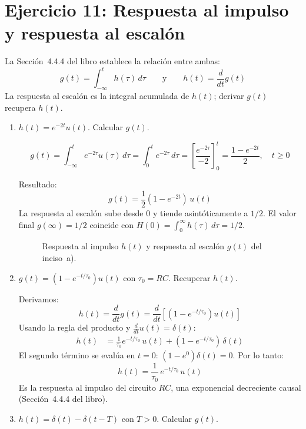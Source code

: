 \documentclass[10pt,a4paper]{article}
\begin{document}
	\section*{Ejercicio 11: Respuesta al impulso y respuesta al escalón}
	
	La Sección~4.4.4 del libro establece la relación entre ambas:
	\[
	g(t) = \int_{-\infty}^{t} h(\tau)\,d\tau \qquad \text{y} \qquad h(t) = \frac{d}{dt}g(t)
	\]
	La respuesta al escalón es la integral acumulada de $h(t)$; derivar $g(t)$ recupera $h(t)$.
	
	\begin{enumerate}[label=\textbf{\alph*)}]
		\item $h(t) = e^{-2t}u(t)$. Calcular $g(t)$.
		
		\[
		g(t) = \int_{-\infty}^{t} e^{-2\tau}u(\tau)\,d\tau = \int_0^{t} e^{-2\tau}\,d\tau = \left[\frac{e^{-2\tau}}{-2}\right]_0^t = \frac{1 - e^{-2t}}{2}, \quad t \geq 0
		\]
		
		Resultado:
		\[
		\boxed{g(t) = \frac{1}{2}(1 - e^{-2t})\,u(t)}
		\]
		La respuesta al escalón sube desde $0$ y tiende asintóticamente a $1/2$. El valor final $g(\infty) = 1/2$ coincide con $H(0) = \int_0^\infty h(\tau)\,d\tau = 1/2$.
		
		\begin{figure}[H]
		\centering
		
		\caption{Respuesta al impulso $h(t)$ y respuesta al escalón $g(t)$ del inciso~a).}
		\end{figure}
		
		\item $g(t) = (1-e^{-t/\tau_0})u(t)$ con $\tau_0 = RC$. Recuperar $h(t)$.
		
		Derivamos:
		\[
		h(t) = \frac{d}{dt}g(t) = \frac{d}{dt}\left[(1 - e^{-t/\tau_0})u(t)\right]
		\]
		Usando la regla del producto y $\frac{d}{dt}u(t) = \delta(t)$:
		\begin{align*}
		h(t) &= \frac{1}{\tau_0}e^{-t/\tau_0}\,u(t) + (1 - e^{-t/\tau_0})\,\delta(t)
		\end{align*}
		El segundo término se evalúa en $t = 0$: $(1 - e^0)\delta(t) = 0$. Por lo tanto:
		\[
		\boxed{h(t) = \frac{1}{\tau_0}\,e^{-t/\tau_0}\,u(t)}
		\]
		Es la respuesta al impulso del circuito $RC$, una exponencial decreciente causal (Sección~4.4.4 del libro).
		
		\item $h(t) = \delta(t) - \delta(t-T)$ con $T > 0$. Calcular $g(t)$.
		

\end{enumerate}
\end{document}
